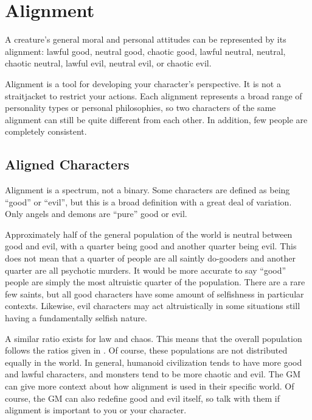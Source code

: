 \section{Alignment}\label{Alignment}
    A creature's general moral and personal attitudes can be represented by its alignment: lawful good, neutral good, chaotic good, lawful neutral, neutral, chaotic neutral, lawful evil, neutral evil, or chaotic evil.

    Alignment is a tool for developing your character's perspective.
    It is not a straitjacket to restrict your actions.
    Each alignment represents a broad range of personality types or personal philosophies, so two characters of the same alignment can still be quite different from each other.
    In addition, few people are completely consistent.

    \subsection{Aligned Characters}
        Alignment is a spectrum, not a binary.
        Some characters are defined as being ``good'' or ``evil'', but this is a broad definition with a great deal of variation.
        Only angels and demons are ``pure'' good or evil.

        Approximately half of the general population of the world is neutral between good and evil, with a quarter being good and another quarter being evil.
        This does not mean that a quarter of people are all saintly do-gooders and another quarter are all psychotic murders.
        It would be more accurate to say ``good'' people are simply the most altruistic quarter of the population.
        There are a rare few saints, but all good characters have some amount of selfishness in particular contexts.
        Likewise, evil characters may act altruistically in some situations still having a fundamentally selfish nature.

        A similar ratio exists for law and chaos.
        This means that the overall population follows the ratios given in .
        Of course, these populations are not distributed equally in the world.
        In general, humanoid civilization tends to have more good and lawful characters, and monsters tend to be more chaotic and evil.
        The GM can give more context about how alignment is used in their specific world.
        Of course, the GM can also redefine good and evil itself, so talk with them if alignment is important to you or your character.

